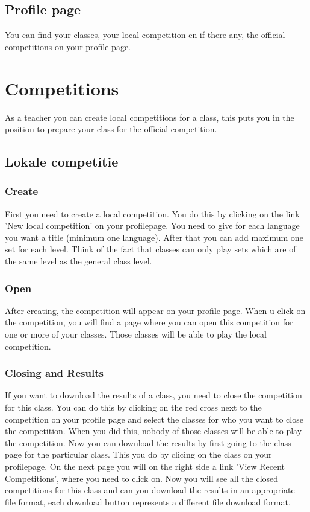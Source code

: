 \documentclass[11pt,a4paper]{report}
\begin{document}
\subsection{Profile page}
You can find your classes, your local competition en if there any, the official competitions on your profile page.
\section{Competitions}
As a teacher you can create local competitions for a class, this puts you in the position to prepare your class for the official competition.
\subsection{Lokale competitie}
\subsubsection{Create}
First you need to create a local competition. You do this by clicking on the link 'New local competition' on your profilepage. You need to give for each language you want a title (minimum one language). After that you can add maximum one set for each level. Think of the fact that classes can only play sets which are of the same level as the general class level.
\subsubsection{Open}
After creating, the competition will appear on your profile page. When u click on the competition, you will find a page where you can open this competition for one or more of your classes. Those classes will be able to play the local competition.

\subsubsection{Closing and Results}
If you want to download the results of a class, you need to close the competition for this class. You can do this by clicking on the red cross next to the competition on your profile page and select the classes for who you want to close the competition. When you did this, nobody of those classes will be able to play the competition. Now you can download the results by first going to the class page for the particular class. This you do by clicing on the class on your profilepage. On the next page you will on the right side a link 'View Recent Competitions', where you need to click on. Now you will see all the closed competitions for this class and can you download the results in an appropriate file format, each download button represents a different file download format. 
\end{document}
